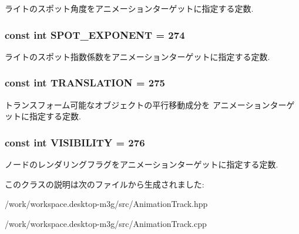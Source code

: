 ライトのスポット角度をアニメーションターゲットに指定する定数. \hypertarget{classm3g_1_1AnimationTrack_90c55bd356e55166244416c6f758ea94}{
\subsubsection[{SPOT\_\-EXPONENT}]{\setlength{\rightskip}{0pt plus 5cm}const int {\bf SPOT\_\-EXPONENT} = 274}}
\label{classm3g_1_1AnimationTrack_90c55bd356e55166244416c6f758ea94}


ライトのスポット指数係数をアニメーションターゲットに指定する定数. \hypertarget{classm3g_1_1AnimationTrack_a691826dccd8c22144e61216de4f680c}{
\subsubsection[{TRANSLATION}]{\setlength{\rightskip}{0pt plus 5cm}const int {\bf TRANSLATION} = 275}}
\label{classm3g_1_1AnimationTrack_a691826dccd8c22144e61216de4f680c}


トランスフォーム可能なオブジェクトの平行移動成分を アニメーションターゲットに指定する定数. \hypertarget{classm3g_1_1AnimationTrack_f248c44b5d4962472c6533cdeffc6fe9}{
\subsubsection[{VISIBILITY}]{\setlength{\rightskip}{0pt plus 5cm}const int {\bf VISIBILITY} = 276}}
\label{classm3g_1_1AnimationTrack_f248c44b5d4962472c6533cdeffc6fe9}


ノードのレンダリングフラグをアニメーションターゲットに指定する定数. 

このクラスの説明は次のファイルから生成されました:\begin{CompactItemize}
\item 
/work/workspace.desktop-m3g/src/AnimationTrack.hpp\item 
/work/workspace.desktop-m3g/src/AnimationTrack.cpp\end{CompactItemize}
